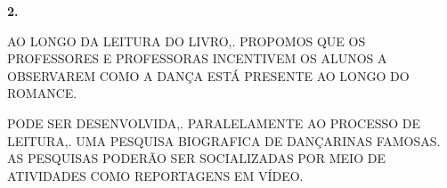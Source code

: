 \documentclass[12pt]{extarticle}
\begin{document}





\textbf{2. }

AO LONGO DA LEITURA DO LIVRO,. PROPOMOS QUE OS PROFESSORES E PROFESSORAS
  INCENTIVEM OS ALUNOS A OBSERVAREM COMO A DANÇA ESTÁ PRESENTE AO LONGO DO
  ROMANCE.






PODE SER DESENVOLVIDA,. PARALELAMENTE AO PROCESSO DE LEITURA,. UMA
PESQUISA BIOGRAFICA DE DANÇARINAS FAMOSAS. AS PESQUISAS PODERÃO SER
SOCIALIZADAS POR MEIO DE ATIVIDADES COMO REPORTAGENS EM VÍDEO.
\end{document}
